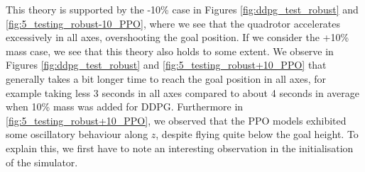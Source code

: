 This theory is supported by the -10\% case in Figures \ref{fig:ddpg_test_robust} and \ref{fig:5_testing_robust-10_PPO}, where we see that the quadrotor accelerates excessively in all axes, overshooting the goal position. If we consider the +10\% mass case, we see that this theory also holds to some extent. We observe in Figures \ref{fig:ddpg_test_robust} and \ref{fig:5_testing_robust+10_PPO} that generally takes a bit longer time to reach the goal position in all axes, for example taking less 3 seconds in all axes compared to about 4 seconds in average when 10\% mass was added for DDPG.
Furthermore in \cref{fig:5_testing_robust+10_PPO}, we observed that the PPO models exhibited some oscillatory behaviour along $z$, despite flying quite below the goal height. To explain this, we first have to note an interesting observation in the initialisation of the simulator.

